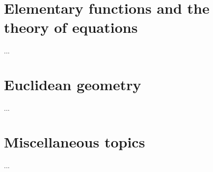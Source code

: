 \documentclass[one]{article}
\begin{document}
\section{Elementary functions and the theory of equations}

...

\section{Euclidean geometry}

...

\section{Miscellaneous topics}

...
\end{document}
